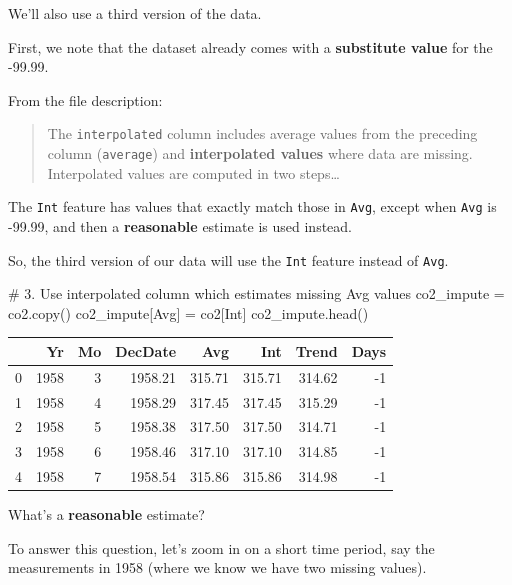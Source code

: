 \documentclass[
  letterpaper,
  DIV=11,
  numbers=noendperiod]{scrreprt}
\newenvironment{Shaded}{\begin{snugshade}}{\end{snugshade}}
\newcommand{\CommentTok}[1]{\textcolor[rgb]{0.37,0.37,0.37}{#1}}
\newcommand{\NormalTok}[1]{\textcolor[rgb]{0.00,0.23,0.31}{#1}}
\newcommand{\OperatorTok}[1]{\textcolor[rgb]{0.37,0.37,0.37}{#1}}
\newcommand{\StringTok}[1]{\textcolor[rgb]{0.13,0.47,0.30}{#1}}
\begin{document}
We'll also use a third version of the data.

First, we note that the dataset already comes with a \textbf{substitute
value} for the -99.99.

From the file description:

\begin{quote}
The \texttt{interpolated} column includes average values from the
preceding column (\texttt{average}) and \textbf{interpolated values}
where data are missing. Interpolated values are computed in two
steps\ldots{}
\end{quote}

The \texttt{Int} feature has values that exactly match those in
\texttt{Avg}, except when \texttt{Avg} is -99.99, and then a
\textbf{reasonable} estimate is used instead.

So, the third version of our data will use the \texttt{Int} feature
instead of \texttt{Avg}.

\begin{Shaded}
\begin{Highlighting}[]
\CommentTok{\# 3. Use interpolated column which estimates missing Avg values}
\NormalTok{co2\_impute }\OperatorTok{=}\NormalTok{ co2.copy()}
\NormalTok{co2\_impute[}\StringTok{\textquotesingle{}Avg\textquotesingle{}}\NormalTok{] }\OperatorTok{=}\NormalTok{ co2[}\StringTok{\textquotesingle{}Int\textquotesingle{}}\NormalTok{]}
\NormalTok{co2\_impute.head()}
\end{Highlighting}
\end{Shaded}

\begin{tabular}{lrrrrrrr}
\toprule
{} &    Yr &  Mo &  DecDate &    Avg &    Int &  Trend &  Days \\
\midrule
0 &  1958 &   3 &  1958.21 & 315.71 & 315.71 & 314.62 &    -1 \\
1 &  1958 &   4 &  1958.29 & 317.45 & 317.45 & 315.29 &    -1 \\
2 &  1958 &   5 &  1958.38 & 317.50 & 317.50 & 314.71 &    -1 \\
3 &  1958 &   6 &  1958.46 & 317.10 & 317.10 & 314.85 &    -1 \\
4 &  1958 &   7 &  1958.54 & 315.86 & 315.86 & 314.98 &    -1 \\
\bottomrule
\end{tabular}

What's a \textbf{reasonable} estimate?

To answer this question, let's zoom in on a short time period, say the
measurements in 1958 (where we know we have two missing values).
\end{document}
